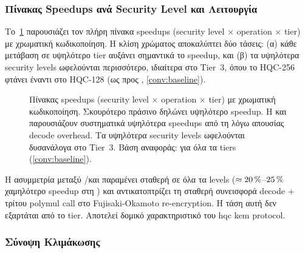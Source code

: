 \subsubsection{Πίνακας Speedups ανά Security Level και Λειτουργία}
\label{ssec:scaling-heatmap}

Το~\cref{fig:heatmap-speedups} παρουσιάζει τον πλήρη πίνακα speedups
(security level $\times$ operation $\times$ tier) με χρωματική
κωδικοποίηση. Η κλίση χρώματος αποκαλύπτει δύο τάσεις: (α) κάθε
μετάβαση σε υψηλότερο tier αυξάνει σημαντικά το speedup, και (β) τα
υψηλότερα security levels ωφελούνται περισσότερο, ιδιαίτερα στο Tier~3,
όπου το HQC-256 \KeyGen φτάνει  έναντι 
στο HQC-128 (ως προς , \cref{conv:baseline}).

\begin{figure}[htbp]
  \centering
  
  \caption{Πίνακας speedups (security level $\times$ operation $\times$
    tier) με χρωματική κωδικοποίηση. Σκουρότερο πράσινο δηλώνει
    υψηλότερο speedup. Η \KeyGen και \Encaps παρουσιάζουν συστηματικά
    υψηλότερα speedups από τη \Decaps λόγω απουσίας decode overhead.
    Τα υψηλότερα security levels ωφελούνται δυσανάλογα στο Tier~3.
    Βάση αναφοράς:  για όλα τα tiers
    (\cref{conv:baseline}).}
  \label{fig:heatmap-speedups}
\end{figure}

Η ασυμμετρία μεταξύ \KeyGen/\Encaps και \Decaps παραμένει σταθερή σε
όλα τα levels ($\approx \SI{20}{\percent}$–$\SI{25}{\percent}$ χαμηλότερο speedup στη
\Decaps) και αντικατοπτρίζει τη σταθερή συνεισφορά decode $+$ τρίτου
polymul call στο Fujisaki-Okamoto re-encryption. Η τάση αυτή δεν
εξαρτάται από το tier. Αποτελεί δομικό χαρακτηριστικό του \gls{hqc} \gls{kem}
protocol.

\subsubsection{Σύνοψη Κλιμάκωσης}
\label{ssec:scaling-summary}

